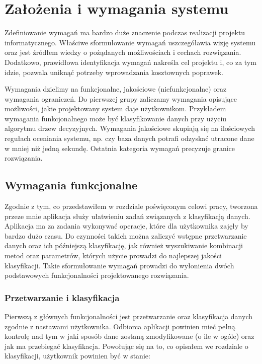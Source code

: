 \documentclass[../thesis.tex]{subfiles}
\begin{document}
\pagestyle{plain}

\chapter{Założenia i wymagania systemu}

Zdefiniowanie wymagań ma bardzo duże znaczenie podczas realizacji projektu informatycznego. Właściwe sformułowanie wymagań uszczegóławia wizję systemu oraz jest źródłem wiedzy o pożądanych możliwościach i cechach rozwiązania. Dodatkowo, prawidłowa identyfikacja wymagań nakreśla cel projektu i, co za tym idzie, pozwala uniknąć potrzeby wprowadzania kosztownych poprawek.

Wymagania dzielimy na funkcjonalne, jakościowe (niefunkcjonalne) oraz wymagania ograniczeń. Do pierwszej grupy zaliczamy wymagania opisujące możliwości, jakie projektowany system daje użytkownikom. Przykładem wymagania funkcjonalnego może być klasyfikowanie danych przy użyciu algorytmu drzew decyzyjnych. Wymagania jakościowe skupiają się na ilościowych regułach oceniania systemu, np. czy baza danych potrafi odzyskać utracone dane w mniej niż jedną sekundę. Ostatnia kategoria wymagań precyzuje granice rozwiązania.

\section{Wymagania funkcjonalne}

Zgodnie z tym, co przedstawiłem w rozdziale poświęconym celowi pracy, tworzona przeze mnie aplikacja służy ułatwieniu zadań związanych z klasyfikacją danych. Aplikacja ma za zadania wykonywać operacje, które dla użytkownika zajęły by bardzo dużo czasu. Do czynności takich można zaliczyć wstępne przetwarzanie danych oraz ich późniejszą klasyfikację, jak również wyszukiwanie kombinacji metod oraz parametrów, których użycie prowadzi do najlepszej jakości klasyfikacji. Takie sformułowanie wymagań prowadzi do wyłonienia dwóch podstawowych funkcjonalności projektowanego rozwiązania.

\subsection{Przetwarzanie i klasyfikacja}

Pierwszą z głównych funkcjonalności jest przetwarzanie oraz klasyfikacja danych zgodnie z nastawami użytkownika. Odbiorca aplikacji powinien mieć pełną kontrolę nad tym w jaki sposób dane zostaną zmodyfikowane (o ile w ogóle) oraz jak ma przebiegać klasyfikacja. Powołując się na to, co opisałem we rozdziale o klasyfikacji, użytkownik powinien być w stanie:
\end{document}
